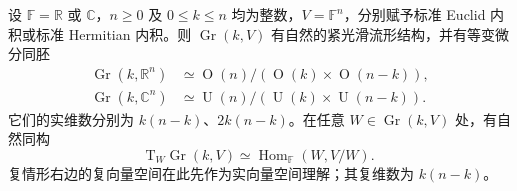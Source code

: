 \begin{theorem}\label{g1:thm:grassmann-homogeneous-model}
	设 \(\mathbb F=\mathbb R\) 或 \(\mathbb C\)，\(n\ge0\) 及 \(0\leq k\leq n\) 均为整数，\(V=\mathbb F^n\)，分别赋予标准 Euclid 内积或标准 Hermitian 内积。则 \(\operatorname{Gr}(k,V)\) 有自然的紧光滑流形结构，并有等变微分同胚
	\begin{align*}
		\operatorname{Gr}(k,\mathbb R^n)&\simeq\operatorname{O}(n)/(\operatorname{O}(k)\times\operatorname{O}(n-k)),\\
		\operatorname{Gr}(k,\mathbb C^n)&\simeq\operatorname{U}(n)/(\operatorname{U}(k)\times\operatorname{U}(n-k)).
	\end{align*}
	它们的实维数分别为 \(k(n-k)\)、\(2k(n-k)\)。在任意 \(W\in\operatorname{Gr}(k,V)\) 处，有自然同构
	\begin{equation}\label{g1:eq:grassmann-tangent}
		\mathrm{T}_W\operatorname{Gr}(k,V)
		\simeq\operatorname{Hom}_{\mathbb F}(W,V/W).
	\end{equation}
	复情形右边的复向量空间在此先作为实向量空间理解；其复维数为 \(k(n-k)\)。
\end{theorem}

